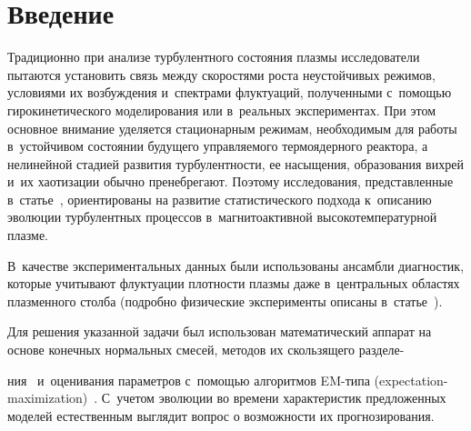 
  



\thispagestyle{headings}

\begin{multicols}{2}

\label{st\stat}

\section{Введение}

Традиционно при анализе турбулентного состояния плазмы исследователи 
пытаются установить связь между скоростями роста неустойчивых режимов, 
условиями их возбуждения и~спектрами флуктуаций, полученными с~по\-мощью 
гирокинетического моделирования или в~реальных экспериментах. 
При этом основное внимание уделяется стационарным режимам, необходимым 
для работы в~устойчивом состоянии будущего управляемого термоядерного 
реактора, а нелинейной стадией развития турбулентности, ее насыщения, 
образования вихрей и~их хаотизации обычно пренебрегают. Поэтому исследования, 
представленные в~статье~\cite{Gorshenin2019a}, ориентированы 
на развитие статистического подхода к~описанию эволюции турбулентных
 процессов в~магнитоактивной высокотемпературной \mbox{плазме}. 

 В~качестве экспериментальных данных были использованы ансамбли 
 диагностик, которые учитывают флуктуации плотности плазмы даже 
 в~цент\-раль\-ных об\-ла\-стях плазменного столба (подробно физические 
 эксперименты описаны в~статье~\cite{Batanov2017}). 
 
 Для 
 решения указанной задачи был использован математический аппарат 
 на основе конечных нормальных смесей, методов их скользящего 
 разделе-\linebreak\vspace*{-12pt}
 
 \columnbreak
 
 \noindent
 ния~\cite{Korolev2011,Gorshenin2013} и~оценивания 
 параметров с~помощью алгоритмов 
 EM-ти\-па (expectation-maximization)~\cite{Lee2018,Cai2019,Hassen2019,Liu2019,Wu2019,Zeller2019}. 
 С~учетом эволюции во времени характеристик предложенных моделей 
 естественным выглядит вопрос о возможности их прогнозирования.


\end{multicols}

